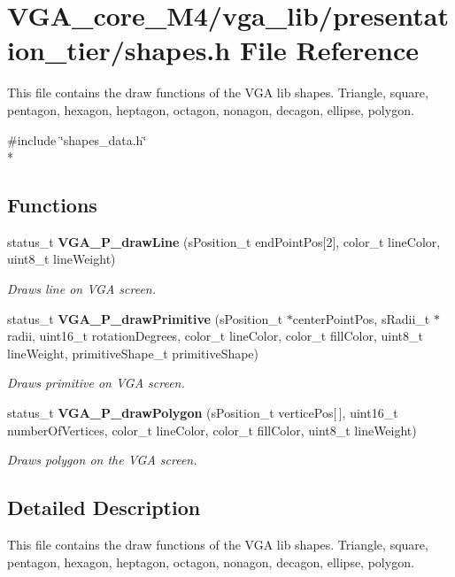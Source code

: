 \section{V\+G\+A\+\_\+core\+\_\+\+M4/vga\+\_\+lib/presentation\+\_\+tier/shapes.h File Reference}
\label{shapes_8h}


This file contains the draw functions of the V\+GA lib shapes. Triangle, square, pentagon, hexagon, heptagon, octagon, nonagon, decagon, ellipse, polygon.  


{\ttfamily \#include \char`\"{}shapes\+\_\+data.\+h\char`\"{}}\\*
\subsection*{Functions}
\begin{DoxyCompactItemize}
\item 
status\+\_\+t {\bf V\+G\+A\+\_\+\+P\+\_\+draw\+Line} (s\+Position\+\_\+t end\+Point\+Pos[2], color\+\_\+t line\+Color, uint8\+\_\+t line\+Weight)
\begin{DoxyCompactList}\small\item\em Draws line on V\+GA screen. \end{DoxyCompactList}\item 
status\+\_\+t {\bf V\+G\+A\+\_\+\+P\+\_\+draw\+Primitive} (s\+Position\+\_\+t $\ast$center\+Point\+Pos, s\+Radii\+\_\+t $\ast$radii, uint16\+\_\+t rotation\+Degrees, color\+\_\+t line\+Color, color\+\_\+t fill\+Color, uint8\+\_\+t line\+Weight, primitive\+Shape\+\_\+t primitive\+Shape)
\begin{DoxyCompactList}\small\item\em Draws primitive on V\+GA screen. \end{DoxyCompactList}\item 
status\+\_\+t {\bf V\+G\+A\+\_\+\+P\+\_\+draw\+Polygon} (s\+Position\+\_\+t vertice\+Pos[$\,$], uint16\+\_\+t number\+Of\+Vertices, color\+\_\+t line\+Color, color\+\_\+t fill\+Color, uint8\+\_\+t line\+Weight)
\begin{DoxyCompactList}\small\item\em Draws polygon on the V\+GA screen. \end{DoxyCompactList}\end{DoxyCompactItemize}


\subsection{Detailed Description}
This file contains the draw functions of the V\+GA lib shapes. Triangle, square, pentagon, hexagon, heptagon, octagon, nonagon, decagon, ellipse, polygon. 



